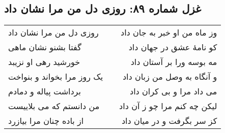 \begin{center}
\section*{غزل شماره ۸۹: روزی دل من مرا نشان داد}
\label{sec:089}
\begin{longtable}{l p{0.5cm} r}
روزی دل من مرا نشان داد
&&
وز ماه من او خبر به جان داد
\\
گفتا بشنو نشان ماهی
&&
کو نامهٔ عشق در جهان داد
\\
خورشید رهی او نزیبد
&&
مه بوسه ورا بر آستان داد
\\
یک روز مرا بخواند و بنواخت
&&
و آنگاه به وصل من زبان داد
\\
برداشت پیاله و دمادم
&&
می داد مرا و بی کران داد
\\
من دانستم که می بلاییست
&&
لیکن چه کنم مرا چو ز آن داد
\\
از باده چنان مرا بیازرد
&&
کز سر بگرفت و در میان داد
\\
\end{longtable}
\end{center}
